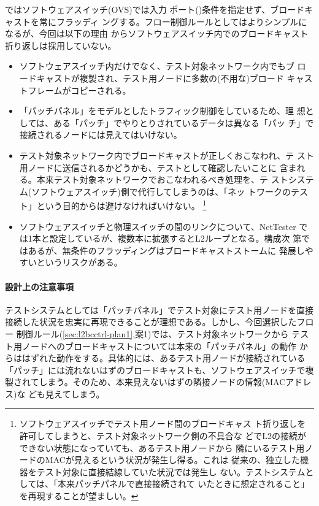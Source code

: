 ではソフトウェアスイッチ(OVS)では入力
ポート()条件を指定せず、ブロードキャストを常にフラッディ
ングする。フロー制御ルールとしてはよりシンプルになるが、今回は以下の理由
からソフトウェアスイッチ内でのブロードキャスト折り返しは採用していない。
\begin{itemize}
 \item ソフトウェアスイッチ内だけでなく、テスト対象ネットワーク内でもブ
       ロードキャストが複製され、テスト用ノードに多数の(不用な)ブロード
       キャストフレームがコピーされる。
 \item 「パッチパネル」をモデルとしたトラフィック制御をしているため、理
       想としては、ある「パッチ」でやりとりされているデータは異なる「パッ
       チ」で接続されるノードには見えてはいけない。
 \item テスト対象ネットワーク内でブロードキャストが正しくおこなわれ、テ
       スト用ノードに送信されるかどうかも、テストとして確認したいことに
       含まれる。本来テスト対象ネットワークでおこなわれるべき処理を、テ
       ストシステム(ソフトウェアスイッチ)側で代行してしまうのは、「ネッ
       トワークのテスト」という目的からは避けなければいけない。
       \footnote{ソフトウェアスイッチでテスト用ノード間のブロードキャス
       ト折り返しを許可してしまうと、テスト対象ネットワーク側の不具合な
       どでL2の接続ができない状態になっていても、あるテスト用ノードから
       隣にいるテスト用ノードのMACが見えるという状況が発生し得る。これは
       従来の、独立した機器をテスト対象に直接結線していた状況では発生し
       ない。テストシステムとしては、「本来パッチパネルで直接接続されて
       いたときに想定されること」を再現することが望ましい。}
 \item ソフトウェアスイッチと物理スイッチの間のリンクについて、NetTester
       では1本と設定しているが、複数本に拡張するとL2ループとなる。構成次
       第ではあるが、無条件のフラッディングはブロードキャストストームに
       発展しやすいというリスクがある。
\end{itemize}

\paragraph{設計上の注意事項}

テストシステムとしては「パッチパネル」でテスト対象にテスト用ノードを直接
接続した状況を忠実に再現できることが理想である。しかし、今回選択したフロー
制御ルール(\ref{sec:l2bcctrl-plan1},案1)では、テスト対象ネットワークから
テスト用ノードへのブロードキャストについては本来の「パッチパネル」の動作
からははずれた動作をする。具体的には、あるテスト用ノードが接続されている
「パッチ」には流れないはずのブロードキャストも、ソフトウェアスイッチで複
製されてしまう。そのため、本来見えないはずの隣接ノードの情報(MACアドレス)な
ども見えてしまう。

